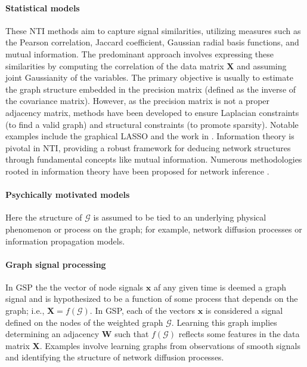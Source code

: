 \paragraph*{Statistical models} These NTI methods aim to capture signal similarities, utilizing measures such as the Pearson correlation, Jaccard coefficient, Gaussian radial basis functions, and mutual information. The predominant approach involves expressing these similarities by computing the correlation of the data matrix $\bm{X}$ and assuming joint Gaussianity of the variables. The primary objective is usually to estimate the graph structure embedded in the precision matrix (defined as the inverse of the covariance matrix). However, as the precision matrix is not a proper adjacency matrix, methods have been developed to ensure Laplacian constraints (to find a valid graph) and structural constraints (to promote sparsity). Notable examples include the graphical LASSO \cite{Mazumder2011GraphicalLassoNew} and the work in \cite{Olsson2006unknownsensorsactuators,Egilmez2021GraphLaplacianLearning}. Information theory is pivotal in NTI, providing a robust framework for deducing network structures through fundamental concepts like mutual information. Numerous methodologies rooted in information theory have been proposed for network inference \cite{Lungarella2006Mappinginformationflow,Villaverde2014MIDERnetworkinference,Ursino2020TransferEntropyas,Novelli2020Inferringnetworkproperties}.%


\paragraph*{Psychically motivated models} Here the structure of $\mathcal{G}$ is assumed to be tied to an underlying physical phenomenon or process on the graph; for example, network diffusion processes or information propagation models.

\paragraph*{Graph signal processing} In GSP the the vector of node signals $\bm{x}$ af any given time is deemed a graph signal and is hypothesized to be a function of some process that depends on the graph; i.e., $\bm{X} = f(\mathcal{G})$. In GSP, each of the vectors $\bm{x}$ is considered a signal defined on the nodes of the weighted graph $\mathcal{G}$. Learning this graph implies determining an adjacency $\bm{W}$ such that $f(\mathcal{G})$ reflects some features in the data matrix $\bm{X}$. Examples involve learning graphs from observations of smooth signals and identifying the structure of network diffusion processes.

